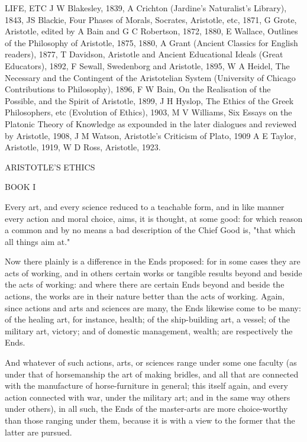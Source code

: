 LIFE, ETC J W Blakesley, 1839, A Crichton (Jardine's Naturalist's
Library), 1843, JS Blackie, Four Phases of Morals, Socrates, Aristotle,
etc, 1871, G Grote, Aristotle, edited by A Bain and G C Robertson, 1872,
1880, E Wallace, Outlines of the Philosophy of Aristotle, 1875, 1880,
A Grant (Ancient Classics for English readers), 1877, T Davidson,
Aristotle and Ancient Educational Ideals (Great Educators), 1892, F
Sewall, Swedenborg and Aristotle, 1895, W A Heidel, The Necessary
and the Contingent of the Aristotelian System (University of Chicago
Contributions to Philosophy), 1896, F W Bain, On the Realisation of the
Possible, and the Spirit of Aristotle, 1899, J H Hyslop, The Ethics of
the Greek Philosophers, etc (Evolution of Ethics), 1903, M V Williams,
Six Essays on the Platonic Theory of Knowledge as expounded in the later
dialogues and reviewed by Aristotle, 1908, J M Watson, Aristotle's
Criticism of Plato, 1909 A E Taylor, Aristotle, 1919, W D Ross,
Aristotle, 1923.




ARISTOTLE'S ETHICS




BOOK I


Every art, and every science reduced to a teachable form, and in like
manner every action and moral choice, aims, it is thought, at some good:
for which reason a common and by no means a bad description of the Chief
Good is, "that which all things aim at."

Now there plainly is a difference in the Ends proposed: for in some
cases they are acts of working, and in others certain works or tangible
results beyond and beside the acts of working: and where there are
certain Ends beyond and beside the actions, the works are in their
nature better than the acts of working. Again, since actions and arts
and sciences are many, the Ends likewise come to be many: of the healing
art, for instance, health; of the ship-building art, a vessel; of
the military art, victory; and of domestic management, wealth; are
respectively the Ends.

And whatever of such actions, arts, or sciences range under some one
faculty (as under that of horsemanship the art of making bridles, and
all that are connected with the manufacture of horse-furniture in
general; this itself again, and every action connected with war, under
the military art; and in the same way others under others), in all such,
the Ends of the master-arts are more choice-worthy than those ranging
under them, because it is with a view to the former that the latter are
pursued.

